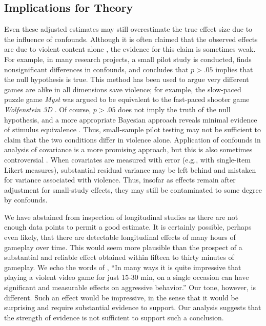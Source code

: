 \documentclass[man]{apa6}
\begin{document}
\subsection{Implications for Theory}
Even these adjusted estimates may still overestimate the true effect size due to the influence of confounds. Although it is often claimed that the observed effects are due to violent content alone \citep[][e.g.,]{Anderson:etal:2004}, the evidence for this claim is sometimes weak. For example, in many research projects, a small pilot study is conducted, finds nonsignificant differences in confounds, and concludes that $p > .05$ implies that the null hypothesis is true. This method has been used to argue very different games are alike in all dimensions save violence; for example, the slow-paced puzzle game {\em Myst} was argued to be equivalent to the fast-paced shooter game {\em Wolfenstein 3D} \citep{Anderson:Dill:2000}. Of course, $p > .05$ does not imply the truth of the null hypothesis, and a more appropriate Bayesian approach reveals minimal evidence of stimulus equivalence \citep{Hilgard:etal:2015}. Thus, small-sample pilot testing may not be sufficient to claim that the two conditions differ in violence alone. Application of confounds in analysis of covariance is a more promising approach, but this is also sometimes controversial \citep{Miller:Chapman:2001}. When covariates are measured with error (e.g., with single-item Likert measures), substantial residual variance may be left behind and mistaken for variance associated with violence. Thus, insofar as effects remain after adjustment for small-study effects, they may still be contaminated to some degree by confounds.

We have abstained from inspection of longitudinal studies as there are not enough data points to permit a good estimate. It is certainly possible, perhaps even likely, that there are detectable longitudinal effects of many hours of gameplay over time. This would seem more plausible than the prospect of a substantial and reliable effect obtained within fifteen to thirty minutes of gameplay. We echo the words of \citet[p. 51]{Bushman:Huesmann:2014}, ``In many ways it is quite impressive that playing a violent video game for just 15-30 min, on a single occasion can have significant and measurable effects on aggressive behavior.'' Our tone, however, is different. Such an effect would be impressive, in the sense that it would be surprising and require substantial evidence to support. Our analysis suggests that the strength of evidence is not sufficient to support such a conclusion.
\end{document}
